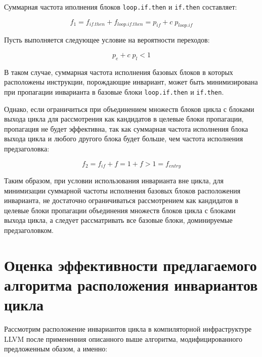 Суммарная частота иполнения блоков \texttt{loop.if.then} и \texttt{if.then} составляет:

$$ f_1 = f_{if.then} + f_{loop.if.then} = p_{if} + c\; p_{loop.if} $$

Пусть выполняется следующее условие на вероятности переходов:

$$ p_e + c\; p_l < 1 $$

В таком случае, суммарная частота исполнения базовых блоков в которых расположены инструкции, порождающие инвариант, может быть минимизирована при пропагации инварианта в базовые блоки \texttt{loop.if.then} и \texttt{if.then}.

Однако, если ограничиться при объединением множеств блоков цикла с блоками выхода цикла для рассмотрения как кандидатов в целевые блоки пропагации, пропагация не будет эффективна, так как суммарная частота исполнения блока выхода цикла и любого другого блока будет больше, чем частота исполнения предзаголовка:

$$ f_2 = f_{if} + f = 1 + f > 1 = f_{entry} $$

Таким образом, при условии использования инварианта вне цикла, для минимизации суммарной частоты исполнения базовых блоков расположения инварианта, не достаточно ограничиваться рассмотрением как кандидатов в целевые блоки пропагации объединения множеств блоков цикла с блоками выхода цикла, а следует рассматривать все базовые блоки, доминируемые предзаголовком.

\section{Оценка эффективности предлагаемого алгоритма расположения инвариантов цикла}

Рассмотрим расположение инвариантов цикла в компиляторной инфраструктуре LLVM после примененния описанного выше алгоритма, модифицированного предложенным обазом, а именно:

